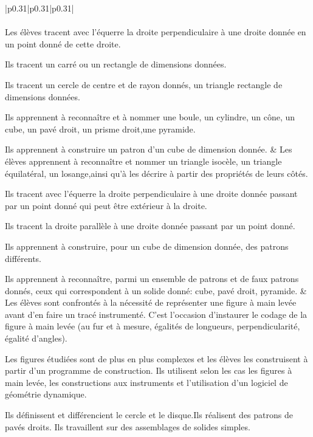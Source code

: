 {\begin{tabular}{|p{0.31\linewidth}|p{0.31\linewidth}|p{0.31\linewidth}|}
{}\\\hline 
{}\\\hline 
Les élèves tracent avec l’équerre la droite perpendiculaire à une droite donnée en un point donné de cette droite.\par
Ils tracent un carré ou un rectangle de dimensions données.\par
Ils tracent un cercle de centre et de rayon donnés, un triangle rectangle de dimensions données.\par 
Ils apprennent à reconnaître et à nommer une boule, un cylindre, un cône, un cube, un pavé droit, un prisme droit,une pyramide.\par 
Ils apprennent à construire un patron d’un cube de dimension donnée.
&
Les élèves apprennent à reconnaître et nommer un triangle isocèle, un triangle équilatéral, un losange,ainsi qu’à les décrire à partir des propriétés de leurs côtés.\par 
Ils tracent avec l’équerre la droite perpendiculaire à une droite donnée passant par un point donné qui peut être extérieur à la droite.\par 
Ils tracent la droite parallèle à une droite donnée passant par un point donné.\par 
Ils apprennent à construire, pour un cube de dimension donnée, des patrons différents.\par 
Ils apprennent à reconnaître, parmi un ensemble de patrons et de faux patrons donnés, ceux qui correspondent à un solide donné: cube, pavé droit, pyramide.
&
Les élèves sont confrontés à la nécessité de représenter une figure à main levée avant d’en faire un tracé instrumenté. C’est l’occasion d’instaurer le codage de la figure à main levée (au fur et à mesure, égalités de longueurs, perpendicularité, égalité d’angles).\par 
Les figures étudiées sont de plus en plus complexes et les élèves les construisent à partir d’un programme de construction. Ils utilisent selon les cas les figures à main levée, les constructions aux instruments et l’utilisation d’un logiciel de géométrie dynamique.\par 
Ils définissent et différencient le cercle et le disque.Ils réalisent des patrons de pavés droits. Ils travaillent sur des assemblages de solides simples.
\\\hline
\end{tabular}
\renewcommand{\arraystretch}{1}
}